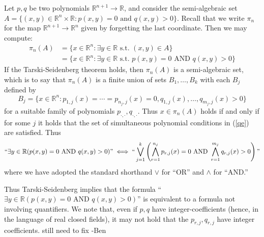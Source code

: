 \documentclass[12pt]{article}
\let\oldref\ref
\renewcommand{\ref}[1]{(\oldref{#1})}
\newcommand{\R}{\mathbb{R}}
\theoremstyle{definition}
\theoremstyle{remark}
\numberwithin{equation}{section}
\begin{document}
Let $p,q$ be two polynomials $\R^{n+1}\to\R$, and consider the semi-algebraic set $A=\{(x,y)\in\R^{n}\times\R:p(x,y)=0\text{ and }q(x,y)>0\}$. Recall that we write $\pi_n$ for the map $\R^{n+1}\to\R^n$ given by forgetting the last coordinate. Then we may compute:
\begin{equation*}
    \begin{split}
    \pi_n(A)&=\{x\in\R^n:\exists y\in\R\text{ s.t. }(x,y)\in A\}\\
    &=\{x\in\R^n:\exists y\in\R\text{ s.t. }p(x,y)=0\text{ AND }q(x,y)>0\}
    \end{split}
\end{equation*}
If the Tarski-Seidenberg theorem holds, then $\pi_n(A)$ is a semi-algebraic set, which is to say that $\pi_n(A)$ is a finite union of sets $B_1,\ldots, B_k$ with each $B_j$ defined by 
\begin{equation}\label{qe}
    B_j=\{x\in\R^n:p_{1,j}(x)=\cdots=p_{n_j,j}(x)=0,q_{1,j}(x),\ldots,q_{m_j,j}(x)>0\}
\end{equation}
for a suitable family of polynomials $p_{\cdot,\cdot},q_{\cdot,\cdot}$. Thus $x\in\pi_n(A)$ holds if and only if for some $j$ it holds that the set of simultaneous polynomial conditions in \ref{qe} are satisfied. Thus
\begin{equation*}
    ``\exists y\in\R(p(x,y)=0\text{ AND }q(x,y)>0)\text{''}\iff``\bigvee_{j=1}^k\left(\bigwedge_{r=1}^{n_j}p_{r,j}(x)=0\text{ AND }\bigwedge_{r=1}^{m_j}q_{r,j}(x)>0\right)\text{''}
\end{equation*}
where we have adopted the standard shorthand $\vee$ for ``OR'' and $\wedge$ for ``AND.''

Thus Tarski-Seidenberg implies that the formula ``$\exists y\in\R(p(x,y)=0\text{ AND }q(x,y)>0)$'' is equivalent to a formula not involving quantifiers. We note that, even if $p,q$ have integer-coefficients (hence, in the language of real closed fields), it may not hold that the $p_{r,j},q_{r,j}$ have integer coefficients. {\color{red} still need to fix -Ben}
\end{document}
